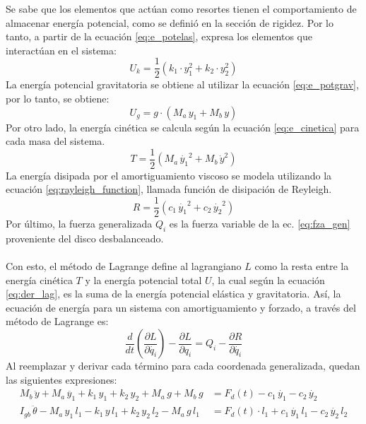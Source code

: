 Se sabe que los elementos que actúan como resortes tienen el comportamiento de almacenar energía potencial, como se definió en la sección de rigidez. Por lo tanto, a partir de la ecuación \ref{eq:e_potelas}, expresa los elementos que interactúan en el sistema:
\begin{equation}
	U_k = \frac{1}{2} \left(k_1\cdot y_1^2 + k_2\cdot y_2^2\right)
\end{equation}
La energía potencial gravitatoria se obtiene al utilizar la ecuación \ref{eq:e_potgrav}, por lo tanto, se obtiene:
\begin{equation}
	U_g = g\cdot \left(M_a\, y_1 + M_b\, y\right)
\end{equation}
Por otro lado, la energía cinética se calcula según la ecuación \ref{eq:e_cinetica} para cada masa del sistema.
\begin{equation}
	T = \frac{1}{2} \left(M_a\, \dot{y_1}^2 + M_b\, \dot{y}^2\right)
\end{equation}
La energía disipada por el amortiguamiento viscoso se modela utilizando la ecuación \ref{eq:rayleigh_function}, llamada función de disipación de Reyleigh. 
\begin{equation}
	R = \frac{1}{2} \left(c_1\, \dot{y_1}^2 + c_2\, \dot{y_2}^2\right)
\end{equation}
Por último, la fuerza generalizada $Q_i$ es la fuerza variable de la ec. \ref{eq:fza_gen} proveniente del disco desbalanceado.\\ \\
Con esto, el método de Lagrange define al lagrangiano $L$ como la resta entre la energía cinética $T$ y la energía potencial total $U$, la cual según la ecuación \ref{eq:der_lag}, es la suma de la energía potencial elástica y gravitatoria. Así, la ecuación de energía para un sistema con amortiguamiento y forzado, a través del método de Lagrange es:
\begin{equation}
	\frac{d}{dt}\left(\frac{\partial L}{\partial \dot{q_i}}\right) - \frac{\partial L}{\partial q_i} = Q_i - \frac{\partial R}{\partial \dot{q_i}}
\end{equation}
\newpage
Al reemplazar y derivar cada término para cada coordenada generalizada, quedan las siguientes expresiones:
\begin{subequations}
\begin{align}
	M_b\, \ddot{y} + M_a\, \ddot{y_1} + k_1\, y_1 + k_2\, y_2 + M_a\, g + M_b\, g &= F_d(t) - c_1\, \dot{y_1} - c_2\, \dot{y_2} \\
	I_{gb}\, \ddot{\theta} - M_a\, y_1\, l_1 - k_1\, y\, l_1 + k_2\, y_2\, l_2 - M_a\, g\, l_1 &= F_d(t)\cdot l_1 + c_1\, \dot{y_1}\, l_1 - c_2\, \dot{y_2}\, l_2 
\end{align}
\end{subequations}

